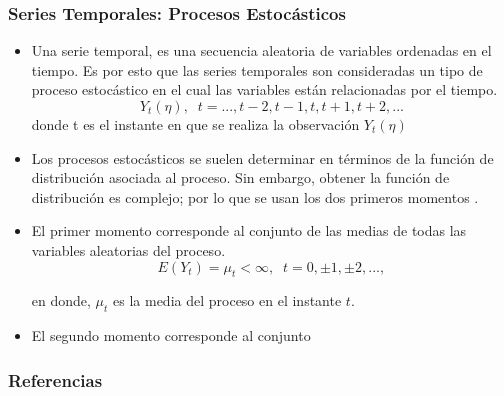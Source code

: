 \documentclass{beamer}
\begin{document}
\begin{frame}
   \frametitle{Series Temporales: Procesos Estocásticos}
   \begin{itemize}
   \scriptsize
   \item  Una serie temporal, es una secuencia aleatoria de variables ordenadas en el tiempo. Es por esto que las series temporales son
   consideradas un tipo de proceso estocástico en el cual las variables están relacionadas por el tiempo.
   \begin{equation} \label{serie_temporal}
      Y_t(\eta), \;\; t = \mbox{...}, t-2, t-1, t, t + 1, t + 2, \mbox{...}
   \end{equation}
    donde t es el instante en que se realiza la observación $Y_t(\eta)$
   \item Los procesos estocásticos se suelen determinar en términos de la función de distribución asociada al proceso. Sin embargo, obtener la función de distribución
   es complejo; por lo que se usan los dos primeros momentos \cite{ser_temp_3}.
   \item El primer momento corresponde al conjunto de las medias de todas las variables aleatorias del proceso.
        \begin{equation}
        E(Y_t) = \mu_t < \infty, \;\; t=0,\pm1,\pm2,...,
        \end{equation}

        en donde, $\mu_t$ es la media del proceso en el instante $t$.
   \item El segundo momento corresponde al conjunto

    
   \end{itemize}
\end{frame}

\begin{frame}[t,allowframebreaks]
   \frametitle{Referencias}
   \printbibliography
\end{frame}
\end{document}
